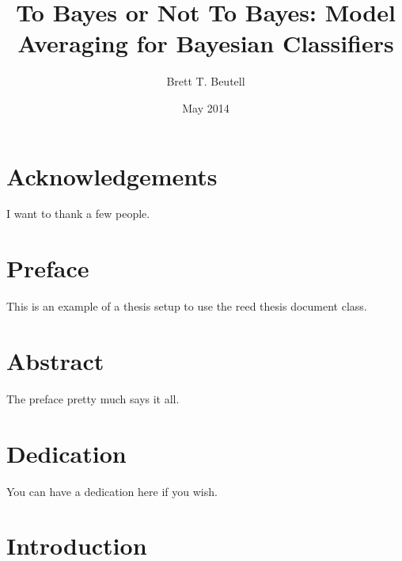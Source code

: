 \documentclass[12pt,twoside]{reedthesis}
\title{To Bayes or Not To Bayes: Model Averaging for Bayesian Classifiers}
\author{Brett T. Beutell}
\date{May 2014}
\begin{document}
  \maketitle
  \frontmatter %
  \pagestyle{empty} %

    \chapter*{Acknowledgements}
	I want to thank a few people.

    \chapter*{Preface}
	This is an example of a thesis setup to use the reed thesis document class.

    \tableofcontents
    \listoftables
    \listoffigures

    \chapter*{Abstract}
	The preface pretty much says it all.
	
	\chapter*{Dedication}
	You can have a dedication here if you wish.

  \mainmatter %
  \pagestyle{fancyplain} %


    \chapter*{Introduction}
\end{document}
